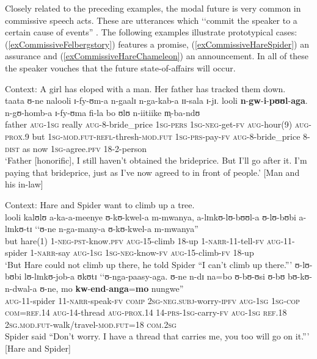 Closely related to the preceding examples, the modal future is very common in commissive speech acts. These are utterances which \lq\lq commit the speaker to a certain cause of events'' \citep[156]{AustinJL1962}. The following examples illustrate prototypical cases: (\ref{exCommissiveFelbergstory}) features a promise, (\ref{exCommissiveHareSpider}) an assurance and (\ref{exCommissiveHareChameleon}) an announcement. In all of these the speaker vouches that the future state-of-affairs will occur.

\begin{exe}
\ex \label{exCommissiveFelbergstory}
Context: A girl has eloped with a man. Her father has tracked them down.\\
\gll taata ʊ-ne nalooli ɪ-fy-ʊm-a n-gaalɪ n-ga-kab-a ɪɪ-sala ɪ-jɪ. looli \textbf{n}-\textbf{gw}-\textbf{i}-\textbf{pʊʊl}-\textbf{aga}. n-gʊ-homb-a ɪ-fy-ʊma fi-la bo ʊlʊ n-iitiike m̩-ba-ndʊ\\
father \textsc{aug}-\textsc{1sg} really \textsc{aug}-8-bride\_price \textsc{1sg}-\textsc{pers} \textsc{1sg}-\textsc{neg}-get-\textsc{fv} \textsc{aug}-hour(9) \textsc{aug}-\textsc{prox.9} but \textsc{1sg}-\textsc{mod.fut}-\textsc{refl}-thresh-\textsc{mod.fut} \textsc{1sg}-\textsc{prs}-pay-\textsc{fv} \textsc{aug}-8-bride\_price 8-\textsc{dist} as now \textsc{1sg}-agree.\textsc{pfv} 18-2-person\\
\glt `Father [honorific], I still haven't obtained the brideprice. But I'll go after it. I'm paying that brideprice, just as I've now agreed to in front of people.' [Man and his in-law]

\ex \label{exCommissiveHareSpider}
Context: Hare and Spider want to climb up a tree.\\
\gll looli kalʊlʊ a-ka-a-meenye ʊ-kʊ-kwel-a m-mwanya, a-lɪnkʊ-lʊ-bʊʊl-a ʊ-lʊ-bʊbi a-lɪnkʊ-tɪ \textup{\lq\lq}ʊ-ne n-ga-many-a ʊ-kʊ-kwel-a m-mwanya\textup{''}\\
but hare(1) 1-\textsc{neg}-\textsc{pst}-know.\textsc{pfv} \textsc{aug}-15-climb 18-up 1-\textsc{narr}-11-tell-\textsc{fv} \textsc{aug}-11-spider 1-\textsc{narr}-say \phantom{\lq\lq}\textsc{aug}-\textsc{1sg} \textsc{1sg}-\textsc{neg}-know-\textsc{fv} \textsc{aug}-15-climb-\textsc{fv} 18-up\\
\glt `But Hare could not climb up there, he told Spider ``I can't climb up there.''{}'
\sn \gll ʊ-lʊ-bʊbi lʊ-lɪnkʊ-job-a ʊkʊtɪ \textup{\lq\lq}ʊ-nga-paasy-aga. ʊ-ne n-dɪ na=bo ʊ-bʊ-ʊsi ʊ-bʊ bʊ-kʊ-n-dwal-a ʊ-ne, mo \textbf{kw}-\textbf{end}-\textbf{anga}=\textbf{mo} nungwe\textup{''}\\
\textsc{aug}-11-spider 11-\textsc{narr}-speak-\textsc{fv} \textsc{comp} \phantom{\lq\lq}\textsc{2sg}-\textsc{neg.subj}-worry-\textsc{ipfv} \textsc{aug}-\textsc{1sg} \textsc{1sg}-\textsc{cop} \textsc{com}=\textsc{ref.14} \textsc{aug}-14-thread \textsc{aug}-\textsc{prox.14} 14-\textsc{prs}-\textsc{1sg}-carry-\textsc{fv} \textsc{aug}-\textsc{1sg} \textsc{ref.18} \textsc{2sg.mod.fut}-walk/travel-\textsc{mod.fut}=18 \textsc{com.2sg}\\
\glt Spider said ``Don't worry. I have a thread that carries me, you too will go on it.''{}' [Hare and Spider]


\end{exe}
